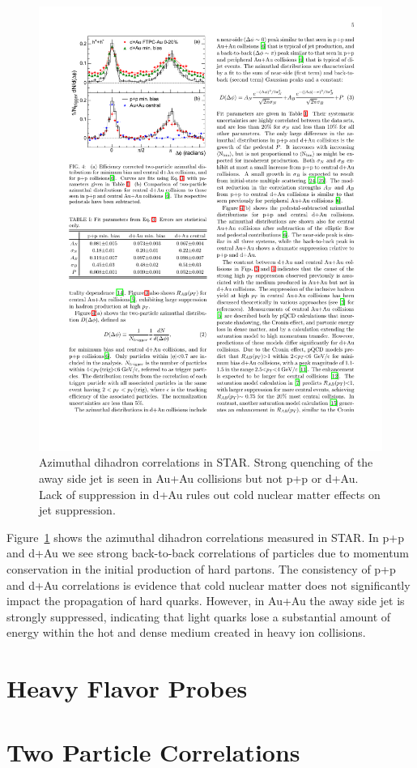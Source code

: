 \begin{figure}[htbp]
\begin{center}
\includegraphics[scale=1.2]{Plots/Intro/jet_quench.pdf}
\end{center}
\caption[Jet Quenching is STAR]{Azimuthal dihadron correlations in STAR. Strong quenching of the away side jet is seen in Au+Au collisions but not p+p or d+Au. Lack of suppression in d+Au rules out cold nuclear matter effects on jet suppression.}
\label{fig:jet_quench}
\end{figure}

Figure~\ref{fig:jet_quench} shows the azimuthal dihadron correlations measured in STAR. In p+p and d+Au we see strong back-to-back correlations of particles due to momentum conservation in the initial production of hard partons. The consistency of p+p and d+Au correlations is evidence that cold nuclear matter does not significantly impact the propagation of hard quarks. However, in Au+Au the away side jet is strongly suppressed, indicating that light quarks lose a substantial amount of energy within the hot and dense medium created in heavy ion collisions.

\section{Heavy Flavor Probes}

\section{Two Particle Correlations}
